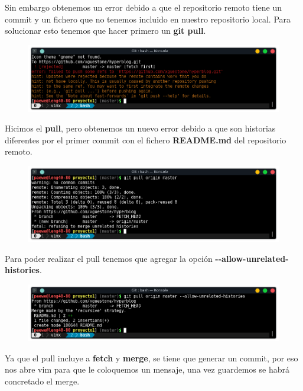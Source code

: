 \documentclass{article}
\begin{document}
Sin embargo obtenemos un error debido a que el repositorio remoto tiene un
commit y un fichero que no tenemos incluido en nuestro repositorio local. Para
solucionar esto tenemos que hacer primero un \textbf{git pull}.

\newpage

\begin{figure}[h!]
  \centering
  \includegraphics[scale=0.75]{./Pictures/191_push_error.png}
\end{figure}

Hicimos el \textbf{pull}, pero obtenemos un nuevo error debido a que son
historias diferentes por el primer commit con el fichero \textbf{README.md} del
repositorio remoto.

\begin{figure}[h!]
  \centering
  \includegraphics[scale=0.75]{./Pictures/192_pull_error.png}
\end{figure}

Para poder realizar el pull tenemos que agregar la opción
\textbf{{-}{-}allow-unrelated-histories}.

\begin{figure}[h!]
  \centering
  \includegraphics[scale=0.75]{./Pictures/193_allow_unrelated_histories.png}
\end{figure}

Ya que el pull incluye a \textbf{fetch} y \textbf{merge}, se tiene que generar
un commit, por eso nos abre vim para que le coloquemos un mensaje, una vez
guardemos se habrá concretado el merge.
\end{document}
